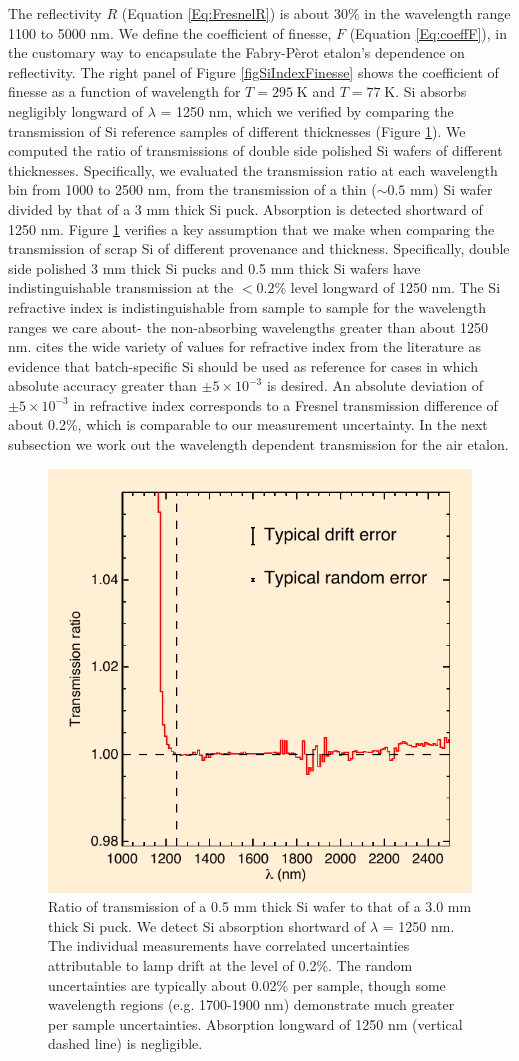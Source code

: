 \documentclass[osajnl,preprint,showpacs,superscriptaddress,12pt]{revtex4-1} %
\begin{document}
The reflectivity $R$ (Equation \ref{Eq:FresnelR}) is about 30\% in the wavelength range 1100 to 5000 nm.  We define the coefficient of finesse\cite{2007fuph.book.....S}, $F$ (Equation \ref{Eq:coeffF}), in the customary way to encapsulate the Fabry-P\`{e}rot etalon's dependence on reflectivity.  The right panel of Figure \ref{figSiIndexFinesse} shows the coefficient of finesse as a function of wavelength for $T = 295\;$K and $T = 77\;$K.  Si absorbs negligibly longward of $\lambda$ = 1250 nm, which we verified by comparing the transmission of Si reference samples of different thicknesses (Figure \ref{figSiAbsorbfig}).  We computed the ratio of transmissions of double side polished Si wafers of different thicknesses.  Specifically, we evaluated the transmission ratio at each wavelength bin from 1000 to 2500 nm, from the transmission of a thin ($\sim0.5$ mm) Si wafer divided by that of a 3 mm thick Si puck.  Absorption is detected shortward of 1250 nm.  Figure \ref{figSiAbsorbfig} verifies a key assumption that we make when comparing the transmission of scrap Si of different provenance and thickness.  Specifically, double side polished 3 mm thick Si pucks and 0.5 mm thick Si wafers have indistinguishable transmission at the $<0.2$\% level longward of 1250 nm.  The Si refractive index is indistinguishable from sample to sample for the wavelength ranges we care about- the non-absorbing wavelengths greater than about 1250 nm.  \cite{2006SPIE.6273E..77F} cites the wide variety of values for refractive index from the literature as evidence that batch-specific Si should be used as reference for cases in which absolute accuracy greater than $\pm5\times10^{-3}$ is desired.  An absolute deviation of $\pm5\times10^{-3}$ in refractive index corresponds to a Fresnel transmission difference of about 0.2\%, which is comparable to our measurement uncertainty.  In the next subsection we work out the wavelength dependent transmission for the air etalon.

\begin{figure}[htbp]
\centerline{\includegraphics[width=0.40\columnwidth]{figs/fpAbsorbfig_alt}}
\caption{Ratio of transmission of a 0.5 mm thick Si wafer to that of a 3.0 mm thick Si puck.  \label{figSiAbsorbfig} We detect Si absorption shortward of $\lambda$ = 1250 nm.  The individual measurements have correlated uncertainties attributable to lamp drift at the level of 0.2\%.  The random uncertainties are typically about 0.02\% per sample, though some wavelength regions (e.g. 1700-1900 nm) demonstrate much greater per sample uncertainties.  Absorption longward of 1250 nm (vertical dashed line) is negligible.}
\end{figure}
\end{document}
